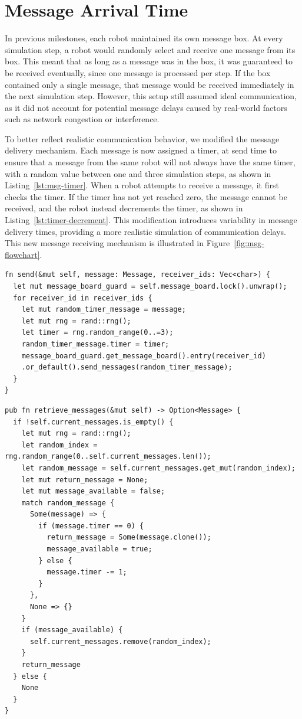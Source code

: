 \documentclass[12pt,a4paper]{article}
\begin{document}
\section{Message Arrival Time}
In previous milestones, each robot maintained its own message box. At every simulation step, a robot would randomly select and receive one message from its box. This meant that as long as a message was in the box, it was guaranteed to be received eventually, since one message is processed per step. If the box contained only a single message, that message would be received immediately in the next simulation step. However, this setup still assumed ideal communication, as it did not account for potential message delays caused by real-world factors such as network congestion or interference.

To better reflect realistic communication behavior, we modified the message delivery mechanism. Each message is now assigned a timer, at send time to ensure that a message from the same robot will not always have the same timer, with a random value between one and three simulation steps, as shown in Listing~\ref{lst:msg-timer}. When a robot attempts to receive a message, it first checks the timer. If the timer has not yet reached zero, the message cannot be received, and the robot instead decrements the timer, as shown in Listing~\ref{lst:timer-decrement}. This modification introduces variability in message delivery times, providing a more realistic simulation of communication delays. This new message receiving mechanism is illustrated in Figure~\ref{fig:msg-flowchart}.

\begin{lstlisting}[float, caption={Message being randomly assigned a timer before being sent}, label={lst:msg-timer}]
fn send(&mut self, message: Message, receiver_ids: Vec<char>) {
  let mut message_board_guard = self.message_board.lock().unwrap();
  for receiver_id in receiver_ids {
    let mut random_timer_message = message;
    let mut rng = rand::rng();
    let timer = rng.random_range(0..=3);
    random_timer_message.timer = timer;
    message_board_guard.get_message_board().entry(receiver_id)
    .or_default().send_messages(random_timer_message);
  }
}
\end{lstlisting}

\begin{lstlisting}[float, caption={New message retrieval mechanism}, label={lst:timer-decrement}]
pub fn retrieve_messages(&mut self) -> Option<Message> {
  if !self.current_messages.is_empty() {
    let mut rng = rand::rng();
    let random_index = rng.random_range(0..self.current_messages.len());
    let random_message = self.current_messages.get_mut(random_index);
    let mut return_message = None;
    let mut message_available = false;
    match random_message {
      Some(message) => {
        if (message.timer == 0) {
          return_message = Some(message.clone());
          message_available = true;
        } else {
          message.timer -= 1;
        }
      },
      None => {}
    }
    if (message_available) {
      self.current_messages.remove(random_index);
    }
    return_message
  } else {
    None
  }
}
\end{lstlisting}
\end{document}

